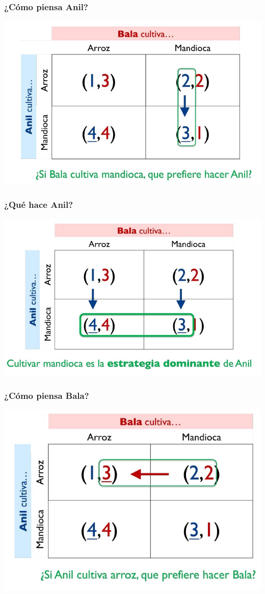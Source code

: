 \documentclass{beamer}
\begin{document}
\begin{frame}
\frametitle{ ¿Cómo piensa Anil?}
\centering
\includegraphics[scale=0.6]{Figures/Tema_03_14_bala.jpg}
\end{frame}

\begin{frame}
\frametitle{ ¿Qué hace Anil?}
\centering
\includegraphics[scale=0.6]{Figures/Tema_03_15_bala.jpg}
\end{frame}

\begin{frame}
\frametitle{ ¿Cómo piensa Bala?}
\centering
\includegraphics[scale=0.6]{Figures/Tema_03_16_bala.jpg}
\end{frame}
\end{document}
